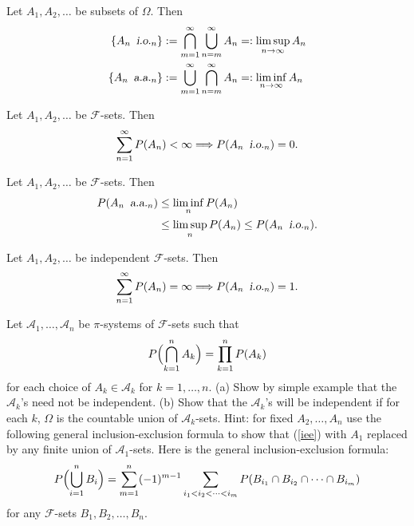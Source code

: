 \begin{definition} Let $A_1, A_2, \ldots$ be subsets of $\Omega$. Then
\begin{align*}
\{A_n\, {\,\,\text{\sl i.o.} }_n\} &:= \bigcap_{m=1}^\infty \bigcup_{n=m}^\infty A_n =: \limsup_{n\rightarrow \infty} A_n\\
\{A_n\, {\,\,\text{\sl a.a.} }_n \}&:= \bigcup_{m=1}^\infty \bigcap_{n=m}^\infty A_n =: \liminf_{n\rightarrow \infty} A_n
\end{align*}
\end{definition}

\begin{theorem}
Let $A_1, A_2, \ldots$ be $\mathcal F$-sets. Then
\[ \sum_{n=1}^\infty P(A_n)<\infty \Longrightarrow P(A_n\, {\,\,\text{\sl i.o.} }_n)=0. \]
\end{theorem}

\begin{theorem}
Let $A_1, A_2, \ldots$ be  $\mathcal F$-sets. Then
\begin{align*}
P(A_n\, {\,\,\text{\sl a.a.} }_n)&\leq \liminf_n P(A_n)\\
&\leq \limsup_n P(A_n)\leq P(A_n\, {\,\,\text{\sl i.o.} }_n).
\end{align*}
\end{theorem}

\begin{theorem}
Let $A_1, A_2, \ldots$ be independent $\mathcal F$-sets. Then
\[ \sum_{n=1}^\infty P(A_n)=\infty \Longrightarrow P(A_n\, {\,\,\text{\sl i.o.} }_n)=1. \]
\end{theorem}



\begin{exercise}
Let $\mathscr A_1,\ldots, \mathscr A_n$ be $\pi$-systems of $\mathcal F$-sets such that
\begin{equation}
\label{iee}
 P\Bigl( \bigcap_{k=1}^n A_k \Bigr) = \prod_{k=1}^n P(A_k)
\end{equation}
for each choice of $A_k\in\mathscr A_k$ for $k=1,\ldots, n$. (a) Show by simple example that the $\mathscr A_k$'s need not be independent. (b) Show that the $\mathscr A_k$'s will be independent if for each $k$, $\Omega$ is the countable union of $\mathscr A_k$-sets. Hint: for fixed $A_2,\ldots, A_n$ use the following general inclusion-exclusion formula to show that  (\ref{iee}) with $A_1$ replaced by any finite union of $\mathscr A_1$-sets. Here is the general inclusion-exclusion formula:
\[ P\Bigl( \bigcup_{i=1}^n B_i \Bigr)= \sum_{m=1}^n (-1)^{m-1}\sum_{i_1< i_2<\cdots<i_m} P(B_{i_1}\cap B_{i_2}\cap \cdots \cap B_{i_m}) \]
for any $\mathcal F$-sets $B_1, B_2,\ldots, B_n$.
\end{exercise}


